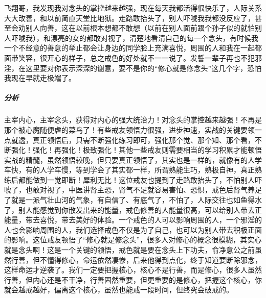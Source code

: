 \begin{case}[练习断念]
    飞翔哥，我发现我对念头的掌控越来越强，现在每天我都活得很快乐了，人际关系大大改善，和以前简直天堂比地狱。走路敢抬头了，别人吓唬我我都没反应了，甚至会劝别人向善，这在以前根本想都不敢想（以前在别人面前跟个孙子似的就怕别人吓唬我），和漂亮的女的都敢对视了，清楚地看清自己的每一个念头，有时候我一个不经意的善意的举止都会让身边的同学脸上充满喜悦，周围的人和我在一起都面带笑容，很开心的样子，总之戒色的好处就不一一说了。发誓一辈子再也不犯邪淫，在这里要对你表示深深的谢意，要不是你的“修心就是修念头”这几个字，恐怕我现在早就走极端了。
    \subparagraph{分析} 主宰内心，主宰念头，获得对内心的强大统治力！对念头的掌控越来越强！不再是那个被心魔随便虐的菜鸟了！有些戒友领悟力很强，进步神速，实战的关键要领一点就透，真正领悟后，只需不断强化练习即可，强化那个觉、那个知、那个看，不断强化！强化！再强化！极致强化！其他一些戒友则需要相当的学习积累才能顿悟实战的精髓，虽然领悟较晚，但只要真正领悟了，其实也是一样的，就像有的人学车快，有的人学车慢，等到学会了其实都一样，所谓熟能生巧，熟极自神，真正熟练后都能做到一觉即断！犀利无比！这位戒友也提到了走路敢抬头了，不怕别人吓唬了，也敢对视了，中医讲肾主恐，肾气不足就容易害怕、恐惧，戒色后肾气养足了就是一派气壮山河的气象，有自信了、有底气了，不怕了，人际交往也如鱼得水了，别人能感觉到你散发出来的能量，戒色修善的人能量很高，可以给别人带去正能量，带去喜悦，带去美好的体验。一个戒色的人可以影响周围的人，一个邪淫的人也会影响周围的人，我们选择戒色不仅是为了自己，也可以为别人带去积极正面的影响。这位戒友顿悟了“修心就是修念头”，很多人对修心的概念很模糊，其实心就是念头啊！这是一个关键的领悟，戒色就是要在念头上下功夫，俞净意公之前虽然行善，但不懂得修心，命运依然凄惨，后来他得到点化，终于知道要断除邪念，这样命运才逆袭了。我们一定要把握核心，核心不是行善，而是修心，很多人虽然行善，但内心还是不干净，行善固然重要，但更重要的是修心，把握这个核心，你就会越戒越好，偏离这个核心，虽然也能戒一段时间，但终究会破戒的。
\end{case}

